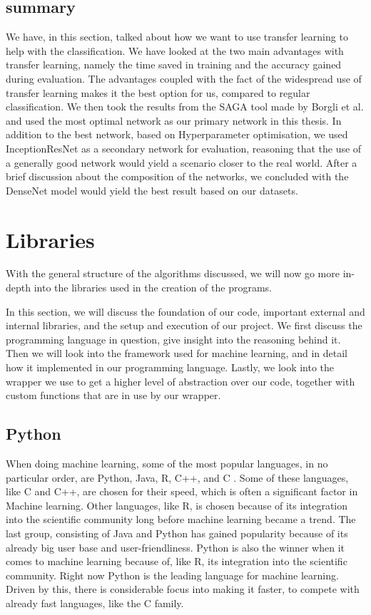 \subsection{summary}
We have, in this section, talked about how we want to use transfer learning to help with the classification. We have looked at the two main advantages with transfer learning, namely the time saved in training and the accuracy gained during evaluation. The advantages coupled with the fact of the widespread use of transfer learning makes it the best option for us, compared to regular classification.
 We then took the results from the SAGA tool made by Borgli et al. and used the most optimal network as our primary network in this thesis. 
In addition to the best network, based on Hyperparameter optimisation, we used InceptionResNet as a secondary network for evaluation, reasoning that the use of a generally good network would yield a scenario closer to the real world.
After a brief discussion about the composition of the networks, we concluded with the DenseNet model would yield the best result based on our datasets.





\section{Libraries} 
With the general structure of the algorithms discussed, we will now go more in-depth into the libraries used in the creation of the programs.

In this section, we will discuss the foundation of our code, important external and internal libraries, and the setup and execution of our project.  
We first discuss the programming language in question, give insight into the reasoning behind it. Then we will look into the framework used for machine learning, and in detail how it implemented in our programming language. Lastly, we look into the wrapper we use to get a higher level of abstraction over our code, together with custom functions that are in use by our wrapper. 

\subsection{Python}
When doing machine learning, some of the most popular languages, in no particular order, are Python, Java, R, C++, and C \cite{kaggle}. Some of these languages, like C and C++, are chosen for their speed, which is often a significant factor in Machine learning. Other languages, like R, is chosen because of its integration into the scientific community long before machine learning became a trend. The last group, consisting of Java and Python has gained popularity because of its already big user base and user-friendliness. Python is also the winner when it comes to machine learning because of, like R, its integration into the scientific community. 
Right now Python is the leading language for machine learning. Driven by this, there is considerable focus into making it faster, to compete with already fast languages, like the C family. 

